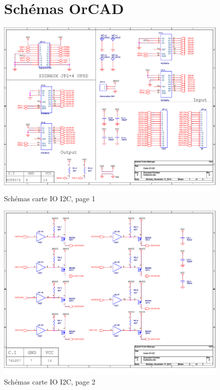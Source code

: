 
\begin{figure}[hbtp]
\section{Schémas OrCAD}
\caption{Schémas carte IO I2C, page 1}
\centering
\includegraphics[scale=0.87,angle=90]{Figures/OrCad/PAGE1.pdf}
\end{figure}

\begin{figure}[hbtp]
\caption{Schémas carte IO I2C, page 2}
\centering
\includegraphics[scale=0.87,angle=90]{Figures/OrCad/PAGE2.pdf}
\end{figure}

